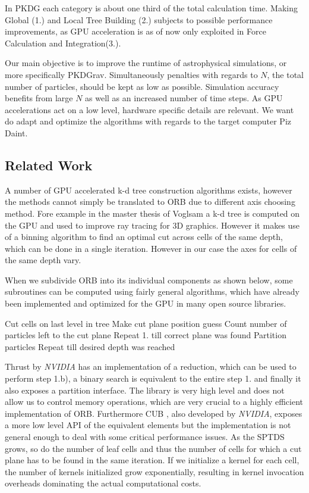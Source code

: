 \documentclass[]{article}
\begin{document}
In PKDG each category is about one third of the total calculation time\cite{Stadel2001}. Making Global (1.) and Local Tree Building (2.) subjects to possible performance improvements, as GPU acceleration is as of now only exploited in Force Calculation and Integration(3.).

Our main objective is to improve the runtime of astrophysical simulations, or more specifically PKDGrav. Simultaneously penalties with regards to $N$, the total number of particles, should be kept as low as possible. Simulation accuracy benefits from large $N$ as well as an increased number of time steps. As GPU accelerations act on a low level, hardware specific details are relevant. We want do adapt and optimize the algorithms with regards to the target computer Piz Daint.


\subsection{Related Work}


A number of GPU accelerated k-d tree construction algorithms exists, however the methods cannot simply be translated to ORB due to different axis choosing method. Fore example in the master thesis of Voglsam \cite{rrt} a k-d tree is computed on the GPU and used to improve ray tracing for 3D graphics. However it makes use of a binning algorithm to find an optimal cut across cells of the same depth, which can be done in a single iteration. However in our case the axes for cells of the same depth vary.

When we subdivide ORB into its individual components as shown below, some subroutines can be computed using fairly general algorithms, which have already been implemented and optimized for the GPU in many open source libraries. 

\begin{outline}[enumerate]
	\1 Cut cells on last level in tree
	\2 Make cut plane position guess
	\2 Count number of particles left to the cut plane
	\2 Repeat 1. till correct plane was found
	\1 Partition particles
	\1 Repeat till desired depth was reached
\end{outline}

Thrust by \textit{NVIDIA} \cite{thrust} has an implementation of a reduction, which can be used to perform step 1.b), a binary search is equivalent to the entire step 1. and finally it also exposes a partition interface. The library is very high level and does not allow us to control memory operations, which are very crucial to a highly efficient implementation of ORB. 
Furthermore CUB \cite{cub}, also developed by \textit{NVIDIA}, exposes a more low level API of the equivalent elements but the implementation is not general enough to deal with some critical performance issues. As the SPTDS grows, so do the number of leaf cells and thus the number of cells for which a cut plane has to be found in the same iteration. If we initialize a kernel for each cell, the number of kernels initialized grow exponentially, resulting in kernel invocation overheads dominating the actual computational costs.
\end{document}
